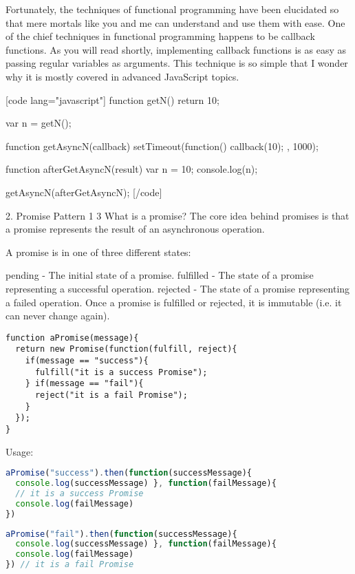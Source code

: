 Fortunately, the techniques of functional programming have been elucidated so that mere mortals like you and me can understand and use them with ease. One of the chief techniques in functional programming happens to be callback functions. As you will read shortly, implementing callback functions is as easy as passing regular variables as arguments. This technique is so simple that I wonder why it is mostly covered in advanced JavaScript topics.

[code lang="javascript"] function getN(){ return 10; }

var n = getN();

function getAsyncN(callback){ setTimeout(function(){ callback(10); }, 1000); }

function afterGetAsyncN(result){ var n = 10; console.log(n); }

getAsyncN(afterGetAsyncN); [/code]

2. Promise Pattern 1 3
What is a promise?
The core idea behind promises is that a promise represents the result of an asynchronous operation.

A promise is in one of three different states:

pending - The initial state of a promise.
fulfilled - The state of a promise representing a successful operation.
rejected - The state of a promise representing a failed operation.
Once a promise is fulfilled or rejected, it is immutable (i.e. it can never change again).


\begin{lstlisting}[language=Javscript]
function aPromise(message){
  return new Promise(function(fulfill, reject){
    if(message == "success"){
      fulfill("it is a success Promise");
    } if(message == "fail"){
      reject("it is a fail Promise");
    }
  });
}
\end{lstlisting}

Usage:

\begin{lstlisting}[language=Javascript]
aPromise("success").then(function(successMessage){
  console.log(successMessage) }, function(failMessage){
  // it is a success Promise
  console.log(failMessage)
})
\end{lstlisting}

\begin{lstlisting}[language=Javascript]
aPromise("fail").then(function(successMessage){
  console.log(successMessage) }, function(failMessage){
  console.log(failMessage)
}) // it is a fail Promise
\end{lstlisting}

